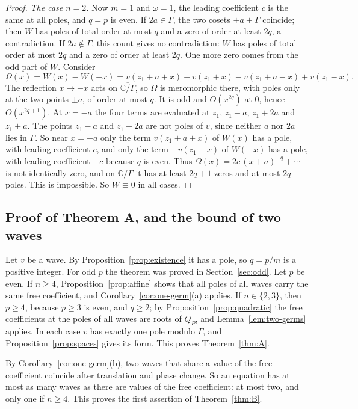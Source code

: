 \documentclass[11pt]{article}
\theoremstyle{definition}
\theoremstyle{remark}
\numberwithin{equation}{section}
\newcommand{\CC}{\mathbb C}
\newcommand{\cyl}{\overline{\CC/\Gamma}}
\begin{document}
\begin{proof}
\emph{The case \(n=2\).} Now \(m=1\) and \(\omega=1\), the leading
coefficient \(c\) is the same at all poles, and \(q=p\) is even. If
\(2a\in\Gamma\), the two cosets \(\pm a+\Gamma\) coincide; then \(W\)
has poles of total order at most \(q\) and a zero of order at least
\(2q\), a contradiction. If \(2a\notin\Gamma\), this count gives no
contradiction: \(W\) has poles of total order at most \(2q\) and a zero
of order at least \(2q\). One more zero comes from the odd part of
\(W\). Consider
\[
 \Omega(x)=W(x)-W(-x)
 =v(z_1+a+x)-v(z_1+x)-v(z_1+a-x)+v(z_1-x).
\]
The reflection \(x\mapsto-x\) acts on \(\cyl\), so \(\Omega\) is
meromorphic there, with poles only at the two points \(\pm a\), of
order at most \(q\). It is odd and \(O(x^{2q})\) at \(0\), hence
\(O(x^{2q+1})\). At \(x=-a\) the four terms are evaluated at \(z_1\),
\(z_1-a\), \(z_1+2a\) and \(z_1+a\). The points \(z_1-a\) and
\(z_1+2a\) are not poles of \(v\), since neither \(a\) nor \(2a\) lies
in \(\Gamma\). So near \(x=-a\) only the term \(v(z_1+a+x)\) of
\(W(x)\) has a pole, with leading coefficient \(c\), and only the term
\(-v(z_1-x)\) of \(W(-x)\) has a pole, with leading coefficient \(-c\)
because \(q\) is even. Thus \(\Omega(x)=2c\,(x+a)^{-q}+\cdots\) is not
identically zero, and on \(\cyl\) it has at least \(2q+1\) zeros and at
most \(2q\) poles. This is impossible. So \(W\equiv0\) in all cases.
\end{proof}

\subsection{Proof of Theorem A, and the bound of two waves}

Let \(v\) be a wave. By Proposition~\ref{prop:existence} it has a pole,
so \(q=p/m\) is a positive integer. For odd \(p\) the theorem was
proved in Section~\ref{sec:odd}. Let \(p\) be even. If \(n\ge4\),
Proposition~\ref{prop:affine} shows that all poles of all waves carry
the same free coefficient, and Corollary~\ref{cor:one-germ}(a) applies.
If \(n\in\{2,3\}\), then \(p\ge4\), because \(p\ge3\) is even, and
\(q\ge2\); by Proposition~\ref{prop:quadratic} the free coefficients at
the poles of all waves are roots of \(Q_P\), and
Lemma~\ref{lem:two-germs} applies.
In each case \(v\) has exactly one pole modulo \(\Gamma\), and
Proposition~\ref{prop:spaces} gives its form. This proves
Theorem~\ref{thm:A}.

By Corollary~\ref{cor:one-germ}(b), two waves that share a value of the
free coefficient coincide after translation and phase change. So an
equation has at most as many waves as there are values of the free
coefficient: at most two, and only one if \(n\ge4\). This proves the
first assertion of Theorem~\ref{thm:B}.
\end{document}
